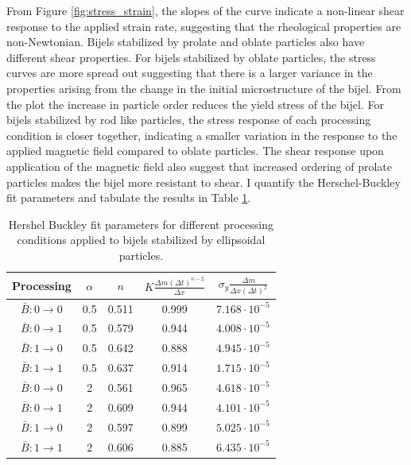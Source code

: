 From Figure \ref{fig:stress_strain}, the slopes of the curve indicate a non-linear shear response to the applied strain rate, suggesting that the rheological properties
are non-Newtonian. Bijels stabilized by prolate and oblate particles also have different shear properties. For bijels stabilized by oblate particles, the stress curves
are more spread out suggesting that there is a larger variance in the properties arising from the change in the initial microstructure of the bijel. From the plot
the increase in particle order reduces the yield stress of the bijel. For bijels stabilized by rod like particles, the stress response of each processing 
condition is closer together, indicating a smaller variation in the response to the applied magnetic field compared to oblate particles. The shear response upon application
of the magnetic field also suggest that increased ordering of prolate particles makes the bijel more resistant to shear. I quantify the Herschel-Buckley fit parameters and 
tabulate the results in Table \ref{table:rheology_fit}.

\begin{table}[h!]
    \centering
    \renewcommand{\arraystretch}{1.5}  %
    \begin{tabular}{||c c c c c||} 
     \hline
     Processing & $\alpha$ & $n$ & $K \frac{\Delta m (\Delta t)^{n-2}}{\Delta x} $ & $\sigma_{y} \frac{\Delta m}{\Delta x (\Delta t)^2}$ \\ [0.5ex] 
     \hline\hline
     $\bar{B}: 0 \rightarrow 0$ & 0.5 & 0.511 & 0.999 & $7.168 \cdot 10^{-5}$ \\ 
     \hline
     $\bar{B}: 0 \rightarrow 1$ & 0.5 & 0.579 & 0.944 & $4.008 \cdot 10^{-5}$ \\
     \hline
     $\bar{B}: 1 \rightarrow 0$ & 0.5 & 0.642 & 0.888 & $4.945 \cdot 10^{-5}$ \\
     \hline
     $\bar{B}: 1 \rightarrow 1$ & 0.5 & 0.637 & 0.914 & $1.715 \cdot 10^{-5}$ \\
     \hline
     $\bar{B}: 0 \rightarrow 0$ & 2 & 0.561 & 0.965 & $4.618 \cdot 10^{-5}$ \\
     \hline
     $\bar{B}: 0 \rightarrow 1$ & 2 & 0.609 & 0.944 & $4.101 \cdot 10^{-5}$ \\
     \hline
     $\bar{B}: 1 \rightarrow 0$ & 2 & 0.597 & 0.899 & $5.025 \cdot 10^{-5}$ \\
     \hline
     $\bar{B}: 1 \rightarrow 1$ & 2 & 0.606 & 0.885 & $6.435 \cdot 10^{-5}$ \\ [1ex] 
     \hline
    \end{tabular}
    \caption{Hershel Buckley fit parameters for different processing conditions applied to bijels stabilized by ellipsoidal particles.}
    \label{table:rheology_fit}
\end{table}
 
